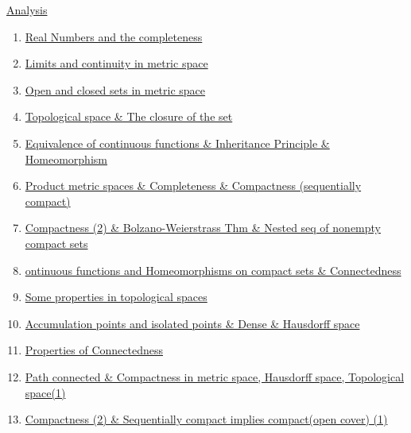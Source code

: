 \documentclass[11pt]{article}
\begin{document}
\newpage 

\begin{center}
	\large {\href{https://www.youtube.com/playlist?list=PLVJXJebpO4PhhPaG5r3Sxp0w89hqCfi0a}{Analysis }}
\end{center}

\vspace{-0.5cm}

\begin{enumerate}
	\item	\href{https://mp.weixin.qq.com/s/bRlM1D6w81x8vi86ZuEzWg}{Real Numbers and the completeness}	%
	\item	\href{https://mp.weixin.qq.com/s/hL4R9oVPgLutPdHZ7OLPqA}{Limits and continuity in metric space}	%
	\item	\href{https://mp.weixin.qq.com/s/Vn2QaB4YH0syKCEP9RDU-w}{Open and closed sets in metric space} 	%
	\item 	\href{https://mp.weixin.qq.com/s/cGzpf5SMo_rp7r-NoGdTLA}{Topological space \& The closure of the set}	%
	\item 	\href{https://mp.weixin.qq.com/s/BeW60DhwiObcZZojUMW1SA}{Equivalence of continuous functions \& Inheritance Principle \& Homeomorphism}	%
	\item 	\href{https://mp.weixin.qq.com/s/RHyS3GBYo60sRzWqn8EJAA}{Product metric spaces \& Completeness \& Compactness (sequentially compact)}	%
	\item 	\href{https://mp.weixin.qq.com/s/CDRp8y0ENUFoTiSQxqJVCA}{Compactness (2) \& Bolzano-Weierstrass Thm \& Nested seq of nonempty compact sets}	%
	\item 	\href{https://mp.weixin.qq.com/s/msGuGyEvq2NrE7SuZJw6Qw}{ontinuous functions and Homeomorphisms on compact sets \& Connectedness}	%
	\item 	\href{https://mp.weixin.qq.com/s/buCGMGHcmv3BNfHYAV4Yog}{Some properties in topological spaces}	%
	\item 	\href{https://mp.weixin.qq.com/s/OMz4s3muR30OcT0tgPF0Fg}{Accumulation points and isolated points \& Dense \& Hausdorff space}	%
	\item	\href{https://mp.weixin.qq.com/s/1M72FTwknBXv7-kJ2robdQ}{Properties of Connectedness}	%
	\item	\href{https://mp.weixin.qq.com/s/6eiS57UPiaBmysPVT5azRA}{Path connected \& Compactness in metric space, Hausdorff space, Topological space(1)}	%
	\item	\href{https://mp.weixin.qq.com/s/XJZS0LKhSQ1LKiBe_QpulA}{Compactness (2) \& Sequentially compact implies compact(open cover) (1)} 	%

\end{enumerate}
\end{document}
